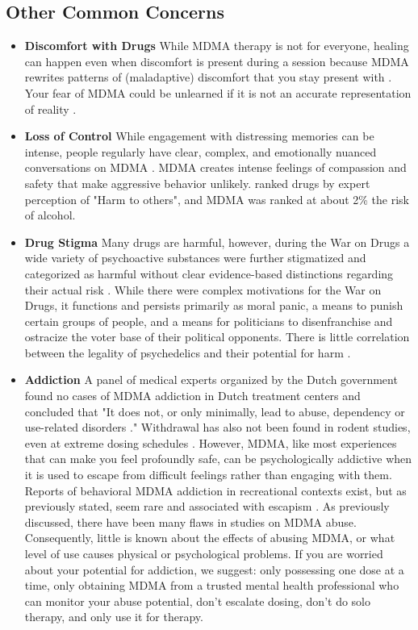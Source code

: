 \documentclass[12pt,letterpaper]{book}
\begin{document}
\subsection*{Other Common Concerns}
\begin{itemize}
    \item \textbf{Discomfort with Drugs}
        While MDMA therapy is not for everyone, healing can happen even when discomfort is present during a session because MDMA rewrites patterns of (maladaptive) discomfort that you stay present with \cite{fedduciaMDMAMemoryReconsolidation}. Your fear of MDMA could be unlearned if it is not an accurate representation of reality \cite{eckerUnlocking}.
    \item \textbf{Loss of Control}
        While engagement with distressing memories can be intense, people regularly have clear, complex, and emotionally nuanced conversations on MDMA \cite{colbertEvenings,passieHistory}. MDMA creates intense feelings of compassion and safety that make aggressive behavior unlikely. \textcite{nuttDrugHarms} ranked drugs by expert perception of "Harm to others", and MDMA was ranked at about 2\% the risk of alcohol.
    \item \textbf{Drug Stigma}
        Many drugs are harmful, however, during the War on Drugs a wide variety of psychoactive substances were further stigmatized and categorized as harmful without clear evidence-based distinctions regarding their actual risk \cite{alexanderNewJimCrow,nuttDrugHarms}. While there were complex motivations for the War on Drugs, it functions and persists primarily as moral panic, a means to punish certain groups of people, and a means for politicians to disenfranchise and ostracize the voter base of their political opponents. There is little correlation between the legality of psychedelics and their potential for harm \cite{nuttDrugHarms}.
    \item \textbf{Addiction}
        A panel of medical experts organized by the Dutch government found no cases of MDMA addiction in Dutch treatment centers and concluded that "It does not, or only minimally, lead to abuse, dependency or use-related disorders \cite{netherlandsMDMA}." Withdrawal has also not been found in rodent studies, even at extreme dosing schedules \cite{robledoDependence}. However, MDMA, like most experiences that can make you feel profoundly safe, can be psychologically addictive when it is used to escape from difficult feelings rather than engaging with them. Reports of behavioral MDMA addiction in recreational contexts exist, but as previously stated, seem rare and associated with escapism \cite{erowidAbuse}. As previously discussed, there have been many flaws in studies on MDMA abuse. Consequently, little is known about the effects of abusing MDMA, or what level of use causes physical or psychological problems. If you are worried about your potential for addiction, we suggest: only possessing one dose at a time, only obtaining MDMA from a trusted mental health professional who can monitor your abuse potential, don't escalate dosing, don't do solo therapy, and only use it for therapy.

\end{itemize}
\end{document}
